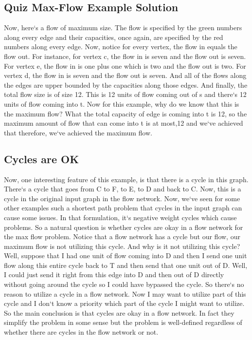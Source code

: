 \subsection{Quiz  Max-Flow Example Solution}
Now, here`s a flow of maximum size.
The flow is specified by the green numbers along every edge and their capacities, once again, are specified by the red numbers along every edge.
Now, notice for every vertex, the flow in equals the flow out.
For instance, for vertex c, the flow in is seven and the flow out is seven.
For vertex e, the flow in is one plus one which is two and the flow out is two.
For vertex d, the flow in is seven and the flow out is seven.
And all of the flows along the edges are upper bounded by the capacities along those edges.
And finally, the total flow size is of size 12.
This is 12 units of flow coming out of s and there`s 12 units of flow coming into t.
Now for this example, why do we know that this is the maximum flow? What the total capacity of edge is coming into t is 12, so the maximum amount of flow that can come into t is at most,12 and we`ve achieved that therefore, we`ve achieved the maximum flow.

\subsection{Cycles are OK}
Now, one interesting feature of this example, is that there is a cycle in this graph.
There`s a cycle that goes from C to F, to E, to D and back to C\@.
Now, this is a cycle in the original input graph in the flow network.
Now, we`ve seen for some other examples such a shortest path problem that cycles in the input graph can cause some issues.
In that formulation, it`s negative weight cycles which cause problems.
So a natural question is whether cycles are okay in a flow network for the max flow problem.
Notice that a flow network has a cycle but our flow, our maximum flow is not utilizing this cycle.
And why is it not utilizing this cycle? Well, suppose that I had one unit of flow coming into D and then I send one unit flow along this entire cycle back to T and then send that one unit out of D\@.
Well, I could just send it right from this edge into D and then out of D directly without going around the cycle so I could have bypassed the cycle.
So there`s no reason to utilize a cycle in a flow network.
Now I may want to utilize part of this cycle and I don`t know a priority which part of the cycle I might want to utilize.
So the main conclusion is that cycles are okay in a flow network.
In fact they simplify the problem in some sense but the problem is well-defined regardless of whether there are cycles in the flow network or not.

